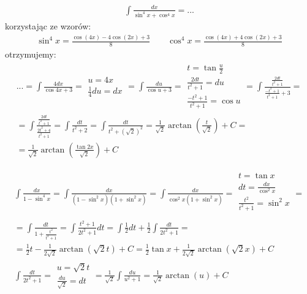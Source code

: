 
\begin{gather*}\int \frac{dx}{\sin^4 x + \cos^4 x}=...\end{gather*}
korzystając ze wzorów:
\begin{gather*}\nonumber \sin^4 x = \frac{\cos(4x) - 4\cos(2x)+3}{8} \qquad \cos^4 x = \frac{\cos(4x) + 4\cos(2x)+3}{8}\end{gather*}
otrzymujemy:
\begin{gather*}\nonumber ...=\int \frac{4dx}{\cos 4x+3} = \begin{array}{|l|} u=4x \\ \frac{1}{4}du=dx \end{array} = \int \frac{du}{\cos u+3} = \begin{array}{|l|}
t=\tan \frac{u}{2} \\
\frac{2dt}{t^2+1}=du \\
\frac{-t^2+1}{t^2+1}=\cos u
\end{array} = \int \frac{\frac{2dt}{t^2+1}}{\frac{-t^2+1}{t^2+1}+3}=  \\
= \int \frac{\frac{2dt}{t^2+1}}{\frac{2t^2+4}{t^2+1}} = \int \frac{dt}{t^2+2} = \int \frac{dt}{t^2+(\sqrt{2})^2} = \frac{1}{\sqrt{2}}\arctan \left(\frac{t}{\sqrt{2}}\right)+C =  \\
= \frac{1}{\sqrt{2}}\arctan \left(\frac{\tan 2x}{\sqrt{2}}\right)+C\end{gather*}



\begin{gather*}\int \frac{dx}{1-\sin^4 x} = \int \frac{dx}{(1-\sin^2x)(1+\sin^2 x)} = \int \frac{dx}{\cos^2x(1+\sin^2x)}= \begin{array}{|l|}
t=\tan x \\
dt=\frac{dx}{\cos^2x} \\
\frac{t^2}{t^2+1}=\sin^2 x \\
\end{array} =  \\
= \int \frac{dt}{1+\frac{t^2}{t^2+1}} = \int \frac{t^2+1}{2t^2+1}dt = \int \frac{1}{2} dt+ \frac{1}{2} \int \frac{dt}{2t^2+1} =  \\
= \frac{1}{2}t-\frac{1}{2\sqrt{2}}\arctan (\sqrt{2}t)+C = \frac{1}{2}\tan x+\frac{1}{2\sqrt{2}}\arctan(\sqrt{2}x)+C \\
\int \frac{dt}{2t^2+1} = \begin{array}{|l|} u=\sqrt{2}t \\ \frac{du}{\sqrt{2}}=dt \end{array} = \frac{1}{\sqrt{2}}\int \frac{du}{u^2+1} = \frac{1}{\sqrt{2}}\arctan(u)+C\end{gather*}

